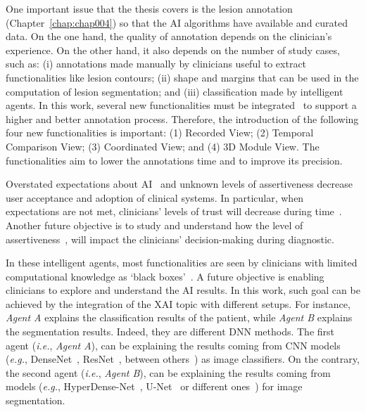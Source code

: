 One important issue that the thesis covers is the lesion annotation (Chapter~\ref{chap:chap004}) so that the \ac{AI} algorithms have available and curated data.
On the one hand, the quality of annotation depends on the clinician’s experience.
On the other hand, it also depends on the number of study cases, such as:
(i) annotations made manually by clinicians useful to extract functionalities like lesion contours;
(ii) shape and margins that can be used in the computation of lesion segmentation; and
(iii) classification made by intelligent agents.
In this work, several new functionalities must be integrated~\cite{hugo2020si} to support a higher and better annotation process.
Therefore, the introduction of the following four new functionalities is important:
(1) Recorded View;
(2) Temporal Comparison View;
(3) Coordinated View; and
(4) 3D Module View.
The functionalities aim to lower the annotations time and to improve its precision.

Overstated expectations about \ac{AI}~\cite{https://doi.org/10.13140/rg.2.2.25412.68486, calisto2019midaaiarfuv} and unknown levels of assertiveness decrease user acceptance and adoption of clinical systems.
In particular, when expectations are not met, clinicians' levels of trust will decrease during time~\cite{Kocielnik:2019:YAI:3290605.3300641}.
Another future objective is to study and understand how the level of assertiveness~\cite{10.1145/3311350.3347162, pacheco2019alignment}, will impact the clinicians' decision-making during diagnostic.

In these intelligent agents, most functionalities are seen by clinicians with limited computational knowledge as `black boxes'~\cite{10.1145/3313831.3376807}.
A future objective is enabling clinicians to explore and understand the \ac{AI} results.
In this work, such goal can be achieved by the integration of the \ac{XAI} topic with different setups.
For instance, {\it Agent A} explains the classification results of the patient, while {\it Agent B} explains the segmentation results.
Indeed, they are different \ac{DNN} methods.
The first agent ({\it i.e.}, {\it Agent A}), can be explaining the results coming from \ac{CNN} models ({\it e.g.}, DenseNet~\cite{Huang_2017_CVPR}, ResNet~\cite{He_2016_CVPR}, between others~\cite{10.1117/12.2549103}) as image classifiers.
On the contrary, the second agent ({\it i.e.}, {\it Agent B}), can be explaining the results coming from models ({\it e.g.}, HyperDense-Net~\cite{8515234}, U-Net~\cite{10.1007/978-3-319-24574-4_28} or different ones~\cite{10.1007/978-3-030-46640-4_23}) for image segmentation.

